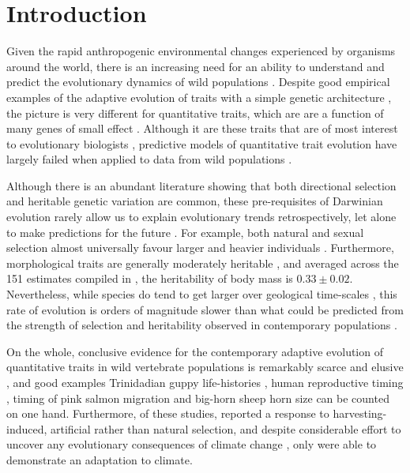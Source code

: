 \section[Introduction]{Introduction}

Given the rapid anthropogenic environmental changes experienced by organisms around the world, there is an increasing need for an ability to understand and predict the evolutionary dynamics of wild populations \parencite{parmesan2006,Merila2014}. Despite good empirical examples of the adaptive evolution of traits with a simple genetic architecture \parencite{vantHof2011,Karell2011,Lamichhaney2016}, the picture is very different for quantitative traits, which are are a function of many genes of small effect \parencite{Wellenreuther2016}. Although it are these traits that are of most interest to evolutionary biologists \parencite{Roff2007, Walsh2014}, predictive models of quantitative trait evolution have largely failed when applied to data from wild populations \parencite{Merila2001}. 

Although there is an abundant literature showing that both directional selection \parencite{Kingsolver2001, Kingsolver2012} and heritable genetic variation \parencite{Mousseau1987,Postma2014} are common, these pre-requisites of Darwinian evolution rarely allow us to explain evolutionary trends retrospectively, let alone to make predictions for the future \parencite{Merila2001, Morrissey2012sts}. For example, both natural and sexual selection almost universally favour larger and heavier individuals \parencite{Blanckenhorn2000}. Furthermore, morphological traits are generally moderately heritable \parencite{Mousseau1987, Postma2014}, and averaged across the 151 estimates compiled in \parencite{Postma2014}, the heritability of body mass is  $0.33\pm0.02$. Nevertheless, while species do tend to get larger over geological time-scales \parencite{Cope1887,Alroy1998,Heim2014,Baker2015}, this rate of evolution is orders of magnitude slower than what could be predicted from the strength of selection and heritability observed in contemporary populations \parencite{Merila2001, Bell2010a, Gotanda2015}.

On the whole, conclusive evidence for the contemporary adaptive evolution of quantitative traits in wild vertebrate populations is remarkably scarce and elusive \parencite{Merila2001,Morrissey2012sts}, and good examples \textemdash Trinidadian guppy life-histories \parencite{Reznick1996}, human reproductive timing \parencite{Milot2011}, timing of pink salmon migration \parencite{Kovach2012} and big-horn sheep horn size \parencite{Pigeon2016}\textemdash can be counted on one hand. Furthermore, of these studies, \parencite{Pigeon2016} reported a response to harvesting-induced, artificial rather than natural selection, and despite considerable effort to uncover any evolutionary consequences of climate change \parencite{Charmantier2014climate,Gienapp2014,Merila2014,Crozier2014}, only \parencite{Kovach2012} were able to demonstrate an adaptation to climate. 

